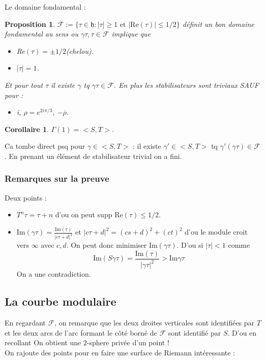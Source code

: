 \documentclass[12pt]{article}
\theoremstyle{plain}
\newtheorem{prop}[subsubsection]{Proposition}
\newtheorem{cor}[subsubsection]{Corollaire}
\theoremstyle{definition}
\theoremstyle{remark}
\newcommand{\h}{\mathfrak{h}}
\newcommand{\F}{\mathcal{F}}
\begin{document}
Le domaine fondamental :
\begin{prop}
    $\F:=\{\tau\in\h:\lvert\tau\rvert\geq1 \text{ et } \lvert\text{Re}(\tau)\rvert\leq 1/2\}$ définit un bon domaine fondamental
    au sens ou $\gamma\tau,\tau\in\F$ implique que 
    \begin{itemize}
        \item Re$(\tau)=\pm1/2$(chelou).
        \item $\lvert\tau\rvert=1$.

    \end{itemize}
    Et pour tout $\tau$ il existe $\gamma$ tq $\gamma\tau\in\F$. En plus les stabilisateurs sont triviaux SAUF pour :
    \begin{itemize}
        \item i, $\rho=e^{2i\pi/3}$, $-\overline{\rho}$.
    \end{itemize}
\end{prop}
\begin{cor}
    $\Gamma(1)=<S,T>$. 
\end{cor}
Ca tombe direct psq pour $\gamma\in <S,T>$ : il existe $\gamma'\in <S,T>$ tq $\gamma'(\gamma\tau)\in\F$. En prenant
un élément de stabilisateur trivial on a fini.


\subsubsection{Remarques sur la preuve}
Deux points :
\begin{itemize}
    \item $T^n\tau=\tau+n$ d'ou on peut supp Re$(\tau)\leq1/2$.
    \item Im$(\gamma\tau)=\frac{\text{Im}(\tau)}{\lvert c\tau+d\rvert^2}$ et $\lvert c\tau+d\rvert^2=(cs+d)^2+(ct)^2$ d'ou 
le module croit vers $\infty$ avec $c, d$. On peut donc minimiser Im$(\gamma\tau)$. D'ou si $\lvert\tau\rvert<1$ comme 
$$\text{Im}(S\gamma\tau)=\frac{\text{Im}(\tau)}{\lvert\gamma\tau\rvert^2}>\text{Im}\gamma\tau$$
On a une contradiction.
\end{itemize}

\subsection{La courbe modulaire}
En regardant $\F$, on remarque que les deux droites verticales sont identifiées par $T$ et les deux arcs de l'arc
formant le côté borné de $\F$ sont identifié par $S$. D'ou en recollant On obtient une $2$-sphere privée d'un point !\\
On rajoute des points pour en faire une surface de Riemann intéressante :
\end{document}
